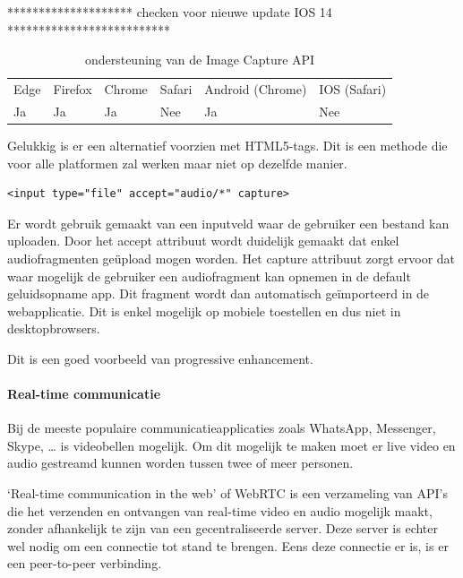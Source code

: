 ******************** checken voor nieuwe update IOS 14 **************************

\begin{table}[H]
	\centering
	\begin{tabular}{llllll}
		Edge & Firefox & Chrome & Safari & Android (Chrome) & IOS (Safari) \\
		Ja   & Ja      & Ja     & Nee     & Ja               & Nee          
	\end{tabular}	
	\caption{ondersteuning van de Image Capture API}
\end{table}

Gelukkig is er een alternatief voorzien met HTML5-tags. Dit is een methode die voor alle platformen zal werken maar niet op dezelfde manier.

\begin{lstlisting}
<input type="file" accept="audio/*" capture>
\end{lstlisting}

Er wordt gebruik gemaakt van een inputveld waar de gebruiker een bestand kan uploaden. Door het accept attribuut wordt duidelijk gemaakt dat enkel audiofragmenten geüpload mogen worden. Het capture attribuut zorgt ervoor dat waar mogelijk de gebruiker een audiofragment kan opnemen in de default geluidsopname app. Dit fragment wordt dan automatisch geïmporteerd in de webapplicatie. Dit is enkel mogelijk op mobiele toestellen en dus niet in desktopbrowsers.

\autocite{Kinlan2019}

Dit is een goed voorbeeld van progressive enhancement. 



\paragraph{Real-time communicatie }



Bij de meeste populaire communicatieapplicaties zoals WhatsApp, Messenger, Skype, … is videobellen mogelijk. Om dit mogelijk te maken moet er live video en audio gestreamd kunnen worden tussen twee of meer personen.

‘Real-time communication in the web’ of WebRTC \autocite{Jennings2020} is een verzameling van API’s die het verzenden en ontvangen van real-time video en audio mogelijk maakt, zonder afhankelijk te zijn van een gecentraliseerde server. Deze server is echter wel nodig om een connectie tot stand te brengen. Eens deze connectie er is, is er een peer-to-peer verbinding.

